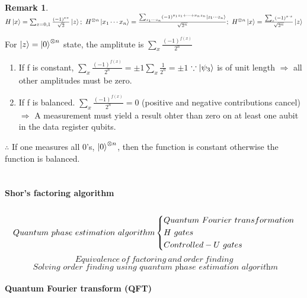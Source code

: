 \documentclass[]{article}
\newtheorem*{remark}{Remark}
\theoremstyle{nonumberplain}
\begin{document}
\begin{remark}
	$H\ket{x}= \sum^{}_{z=0,1} \frac{(-1)^{xz}}{\sqrt{2}}\ket{z};\ H^{\otimes n}\ket{x_{1}\cdots x_{n}}=\frac{ \sum^{}_{z_{1}\cdots z_{n}}(-1)^{x_{1}z_1+\cdots+x_{n}z_{n}}\ket{z_{1}\cdots z_n}}{\sqrt{2^{n}}};\ H^{\otimes n}\ket{x}=\frac{ \sum^{}_{z} (-1)^{x\cdot z}}{\sqrt{2^{n}}}\ket{z}$
\end{remark}
For $\ket{z}=\ket{0}^{\otimes n}$ state, the amplitute is $ \sum^{}_{x} \frac{(-1)^{f(x)}}{2^{n}}$ 
\begin{enumerate}
	\item If f is constant,  $ \sum^{}_{x} \frac{(-1)^{f(x)}}{2^{n}} = \pm 1 \sum^{}_{x} \frac{1}{2^{n}} = \pm 1$ $\because \ket{\psi_{3}}$ is of unit length $\Rightarrow$ all other amplitudes must be zero. 
	\item If f is balanced. $ \sum^{}_{x} \frac{(-1)^{f(x)}}{2^{n}}=0$ (positive and negative contributions cancel) $\Rightarrow$ A measurement must yield a result ohter than zero on at least one aubit in the data register qubits.
\end{enumerate}
$\therefore$ If one measures all 0's, $\ket{0}^{\otimes n}$, then the function is constant otherwise the function is balanced. \\
\\
\\
\textbf{Shor's factoring algorithm} \\
\\
\begin{equation*}
Quantum\ phase\ estimation\ algorithm
\begin{dcases}
Quantum\ Fourier\ transformation\\
H\ gates \\
Controlled-U\ gates 
\end{dcases}
\end{equation*}
\[
	Equivalence\ of\ factoring\ and\ order\ finding
\] 
\[
	\textit{	Solving order finding using quantum phase estimation algorithm}
\] 
\newpage
\ \\
\textbf{Quantum Fourier transform (QFT)} 
\end{document}
